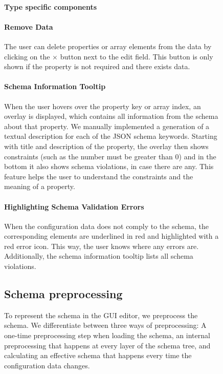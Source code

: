 \begin{figure}[h]

\paragraph{Type specific components}


\paragraph{Remove Data}
The user can delete properties or array elements from the data by clicking on the $\times$ button next to the edit field.
This button is only shown if the property is not required and there exists data.

\paragraph{Schema Information Tooltip}
When the user hovers over the property key or array index, an overlay is displayed, which contains all information from the schema about that property.
We manually implemented a generation of a textual description for each of the JSON schema keywords.
Starting with title and description of the property, the overlay then shows constraints (such as the number must be greater than 0) and in the bottom it also shows schema violations, in case there are any.
This feature helps the user to understand the constraints and the meaning of a property.

\paragraph{Highlighting Schema Validation Errors}
When the configuration data does not comply to the schema, the corresponding elements are underlined in red and highlighted with a red error icon.
This way, the user knows where any errors are.
Additionally, the schema information tooltip lists all schema violations.

\subsection{Schema preprocessing}\label{subsec:schema-preprocessing}

To represent the schema in the GUI editor, we preprocess the schema.
We differentiate between three ways of preprocessing:
A one-time preprocessing step when loading the schema, an internal preprocessing that happens at every layer of the schema tree,
and calculating an effective schema that happens every time the configuration data changes.


\end{figure}
